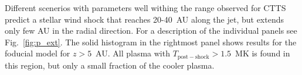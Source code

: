 \label{fig:result}
Different scenerios with parameters well withing the range observed for CTTS predict a stellar wind shock that reaches 20-40~AU along the jet, but extends only few AU in the radial direction. For a description of the individual panels see Fig.~\ref{fig:p_ext}. The solid histogram in the rightmost panel shows results for the foducial model for $z>5$~AU. All plasma with $T_{\mathrm{post-shock}}>1.5$~MK is found in this region, but only a small fraction of the cooler plasma.